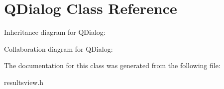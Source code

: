 \hypertarget{class_q_dialog}{}\section{Q\+Dialog Class Reference}
\label{class_q_dialog}


Inheritance diagram for Q\+Dialog\+:


Collaboration diagram for Q\+Dialog\+:


The documentation for this class was generated from the following file\+:\begin{DoxyCompactItemize}
\item 
resultsview.\+h\end{DoxyCompactItemize}
